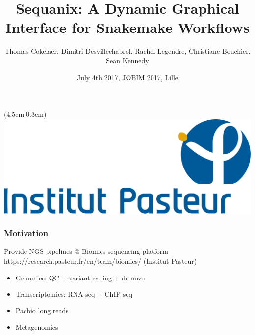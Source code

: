 \documentclass{beamer}
\title[Sequana]{Sequanix: A Dynamic Graphical Interface for Snakemake Workflows}
\author[T. Cokelaer]{Thomas Cokelaer, Dimitri Desvillechabrol, Rachel Legendre, 
Christiane Bouchier, Sean Kennedy}
\institute{Institut Pasteur, Paris}
\date{July 4th 2017, JOBIM 2017, Lille}
\begin{document}

\begin{frame}[plain]
    \titlepage
    \begin{textblock*}{5cm}(4.5cm,0.3cm)
        \includegraphics[scale=0.09]{images/Institut_Pasteur.png}
    \end{textblock*}
\end{frame}







\begin{frame}
\frametitle{Motivation}
\begin{block}{Provide NGS pipelines @ Biomics sequencing platform 
https://research.pasteur.fr/en/team/biomics/ (Institut Pasteur)}
 \begin{itemize}
  \item Genomics: QC + variant calling + de-novo
  \item Transcriptomics: RNA-seq + ChIP-seq 
  \item Pacbio long reads
  \item Metagenomics
 \end{itemize}
\end{block} 
\end{frame}

\usebackgroundtemplate{}
\end{document}
